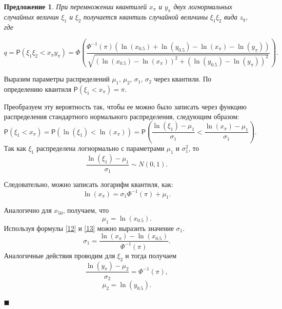 \documentclass[12pt]{article}
\newtheorem{proposition}[theorem]{Предложение}
\newenvironment{Proof}{\par\noindent{\bf Доказательство.}}{\hfill$\scriptstyle\blacksquare$}
\begin{document}
	\begin{proposition}
		При перемножении квантилей $x_{\pi}$ и $y_{\pi}$ двух логнормальных случайных величин $\xi_{1}$ и $\xi_{2}$ получается квантиль случайной величины $\xi_{1}\xi_{2}$ вида $z_{q}$, где
		
		\begin{equation}
			q = \mathsf{P}(\xi_{1}\xi_{2}< x_{\pi}y_{\pi}) =\Phi\left(\frac{\Phi^{-1}(\pi)(\ln(x_{0.5})+\ln(y_{0.5})-\ln(x_{\pi})-\ln(y_{\pi}))}{\sqrt{(\ln(x_{0.5})-\ln(x_{\pi}))^{2}+(\ln(y_{0.5})-\ln(y_{\pi}))^{2}}}\right).
		\end{equation} 
	\end{proposition}
	\begin{Proof}
		Выразим параметры распределений $\mu_{1}$, $\mu_{2}$, $\sigma_{1}$, $\sigma_{2}$ через квантили.
		По определению квантиля $\mathsf{P}(\xi_{1}<x_{\pi}) = \pi$.
		
		Преобразуем эту вероятность так, чтобы ее можно было записать через функцию распределения стандартного нормального распределения, следующим образом:
		\begin{equation*}
			\mathsf{P}(\xi_{1}<x_{\pi}) = \mathsf{P}(\ln(\xi_{1})<\ln(x_{\pi})) = \mathsf{P}\left(\dfrac{\ln(\xi_{1})-\mu_{1}}{\sigma_{1}} < \frac{\ln(x_{\pi})-\mu_{1}}{\sigma_{1}}\right).
		\end{equation*}
		Так как $\xi_{1}$ распределена логнормально с параметрами $\mu_{1}$ и $\sigma_{1}^{2}$, то \[\dfrac{\ln(\xi_{1})-\mu_{1}}{\sigma_{1}} \sim N(0,1).\]
		
		Следовательно, можно записать логарифм квантиля, как:
		\begin{equation}
			\ln(x_{\pi})=\sigma_{1}\Phi^{-1}(\pi)+\mu_{1}.\label{12}
		\end{equation}
		
		Аналогично для $x_{50}$, получаем, что 
		\begin{equation}
			\mu_{1}=\ln(x_{0.5}).\label{13}
		\end{equation}
		Используя формулы \eqref{12} и \eqref{13} можно выразить значение $\sigma_{1}$.
		\begin{equation}
			\sigma_{1}=\frac{\ln(x_{\pi})-\ln(x_{0.5})}{\Phi^{-1}(\pi)}.\label{14}
		\end{equation}
		Аналогичные действия проводим для $\xi_{2}$ и тогда получаем
		\begin{equation}
			\frac{\ln(y_{\pi})-\mu_{2}}{\sigma_{2}}=\Phi^{-1}(\pi),\label{15}
		\end{equation}
		\begin{equation}
			\mu_{2}=\ln(y_{0.5}).\label{16}
		\end{equation}
		

\end{Proof}
\end{document}
